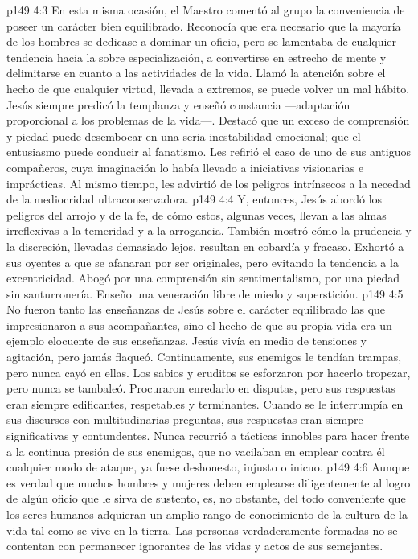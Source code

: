 \vs p149 4:3 \pc En esta misma ocasión, el Maestro comentó al grupo la conveniencia de poseer un carácter bien equilibrado. Reconocía que era necesario que la mayoría de los hombres se dedicase a dominar un oficio, pero se lamentaba de cualquier tendencia hacia la sobre especialización, a convertirse en estrecho de mente y delimitarse en cuanto a las actividades de la vida. Llamó la atención sobre el hecho de que cualquier virtud, llevada a extremos, se puede volver un mal hábito. Jesús siempre predicó la templanza y enseñó constancia ---adaptación proporcional a los problemas de la vida---. Destacó que un exceso de comprensión y piedad puede desembocar en una seria inestabilidad emocional; que el entusiasmo puede conducir al fanatismo. Les refirió el caso de uno de sus antiguos compañeros, cuya imaginación lo había llevado a iniciativas visionarias e imprácticas. Al mismo tiempo, les advirtió de los peligros intrínsecos a la necedad de la mediocridad ultraconservadora.
\vs p149 4:4 Y, entonces, Jesús abordó los peligros del arrojo y de la fe, de cómo estos, algunas veces, llevan a las almas irreflexivas a la temeridad y a la arrogancia. También mostró cómo la prudencia y la discreción, llevadas demasiado lejos, resultan en cobardía y fracaso. Exhortó a sus oyentes a que se afanaran por ser originales, pero evitando la tendencia a la excentricidad. Abogó por una comprensión sin sentimentalismo, por una piedad sin santurronería. Enseño una veneración libre de miedo y superstición.
\vs p149 4:5 No fueron tanto las enseñanzas de Jesús sobre el carácter equilibrado las que impresionaron a sus acompañantes, sino el hecho de que su propia vida era un ejemplo elocuente de sus enseñanzas. Jesús vivía en medio de tensiones y agitación, pero jamás flaqueó. Continuamente, sus enemigos le tendían trampas, pero nunca cayó en ellas. Los sabios y eruditos se esforzaron por hacerlo tropezar, pero nunca se tambaleó. Procuraron enredarlo en disputas, pero sus respuestas eran siempre edificantes, respetables y terminantes. Cuando se le interrumpía en sus discursos con multitudinarias preguntas, sus respuestas eran siempre significativas y contundentes. Nunca recurrió a tácticas innobles para hacer frente a la continua presión de sus enemigos, que no vacilaban en emplear contra él cualquier modo de ataque, ya fuese deshonesto, injusto o inicuo.
\vs p149 4:6 Aunque es verdad que muchos hombres y mujeres deben emplearse diligentemente al logro de algún oficio que le sirva de sustento, es, no obstante, del todo conveniente que los seres humanos adquieran un amplio rango de conocimiento de la cultura de la vida tal como se vive en la tierra. Las personas verdaderamente formadas no se contentan con permanecer ignorantes de las vidas y actos de sus semejantes.
